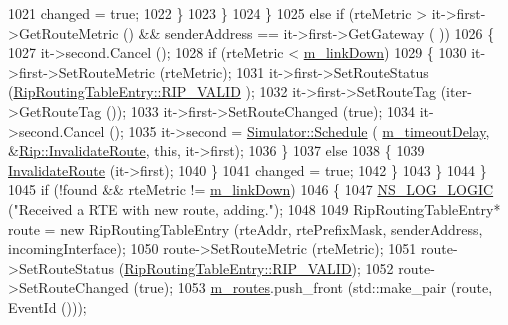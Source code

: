 \begin{DoxyCode}
1021                           changed = \textcolor{keyword}{true};
1022                         \}
1023                     \}
1024                 \}
1025               \textcolor{keywordflow}{else} \textcolor{keywordflow}{if} (rteMetric > it->first->GetRouteMetric () && senderAddress == it->first->GetGateway (
      ))
1026                 \{
1027                   it->second.Cancel ();
1028                   \textcolor{keywordflow}{if} (rteMetric < \hyperlink{classns3_1_1Rip_a3f37d4c5176e380482edf0be82d2fc18}{m\_linkDown})
1029                     \{
1030                       it->first->SetRouteMetric (rteMetric);
1031                       it->first->SetRouteStatus (\hyperlink{classns3_1_1RipRoutingTableEntry_a4326145be5c3027f2ddf9eb80b6127a4ac29e62da26c18bf4b9caa5224cfee895}{RipRoutingTableEntry::RIP\_VALID}
      );
1032                       it->first->SetRouteTag (iter->GetRouteTag ());
1033                       it->first->SetRouteChanged (\textcolor{keyword}{true});
1034                       it->second.Cancel ();
1035                       it->second = \hyperlink{classns3_1_1Simulator_a671882c894a08af4a5e91181bf1eec13}{Simulator::Schedule} (
      \hyperlink{classns3_1_1Rip_a8a684a47271e0e382dd5f485a8a5545b}{m\_timeoutDelay}, &\hyperlink{classns3_1_1Rip_a48b295877e349360bf978c250ae59083}{Rip::InvalidateRoute}, \textcolor{keyword}{this}, it->first);
1036                     \}
1037                   \textcolor{keywordflow}{else}
1038                     \{
1039                       \hyperlink{classns3_1_1Rip_a48b295877e349360bf978c250ae59083}{InvalidateRoute} (it->first);
1040                     \}
1041                   changed = \textcolor{keyword}{true};
1042                 \}
1043             \}
1044         \}
1045       \textcolor{keywordflow}{if} (!found && rteMetric != \hyperlink{classns3_1_1Rip_a3f37d4c5176e380482edf0be82d2fc18}{m\_linkDown})
1046         \{
1047           \hyperlink{group__logging_ga88acd260151caf2db9c0fc84997f45ce}{NS\_LOG\_LOGIC} (\textcolor{stringliteral}{"Received a RTE with new route, adding."});
1048 
1049           RipRoutingTableEntry* route = \textcolor{keyword}{new} RipRoutingTableEntry (rteAddr, rtePrefixMask, senderAddress, 
      incomingInterface);
1050           route->SetRouteMetric (rteMetric);
1051           route->SetRouteStatus (\hyperlink{classns3_1_1RipRoutingTableEntry_a4326145be5c3027f2ddf9eb80b6127a4ac29e62da26c18bf4b9caa5224cfee895}{RipRoutingTableEntry::RIP\_VALID});
1052           route->SetRouteChanged (\textcolor{keyword}{true});
1053           \hyperlink{classns3_1_1Rip_aea6c918ae311cd88fb2bfb714d6f9c30}{m\_routes}.push\_front (std::make\_pair (route, EventId ()));

\end{DoxyCode}
